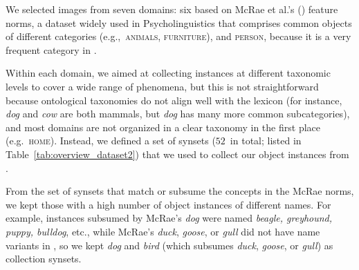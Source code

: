 We selected images from seven domains: six based on McRae et al.'s  (\cite{mcrae2005semantic}) feature norms, a dataset widely used in Psycholinguistics that comprises common objects of different categories (e.g.,~\textsc{animals}, \textsc{furniture}), and \textsc{person}, because it is a very frequent category in \vg.

Within each domain, we aimed at collecting instances at different taxonomic levels to cover a wide range of phenomena, but this is not straightforward because ontological taxonomies do not align well with the lexicon (for instance, \textit{dog} and \textit{cow} are both mammals, but \textit{dog} has many more common subcategories), and most domains are not organized in a clear taxonomy in the first place (e.g.\ \textsc{home}).
Instead, we defined a set of synsets ($52$\ in total; listed in Table~\ref{tab:overview_dataset2}) that we used to collect our object instances from \vg.

From the set of synsets that match or subsume the concepts in the McRae norms, we kept those with a high number of \vg object instances of different names.
For example, \vg instances subsumed by McRae's \textsl{dog} were named \textsl{beagle, greyhound, puppy, bulldog}, etc., while McRae's \textsl{duck}, \textsl{goose}, or \textsl{gull} did not have name variants in \vg, so we kept \textsl{dog} and \textsl{bird} (which subsumes \textsl{duck}, \textsl{goose}, or \textsl{gull}) as collection synsets.


